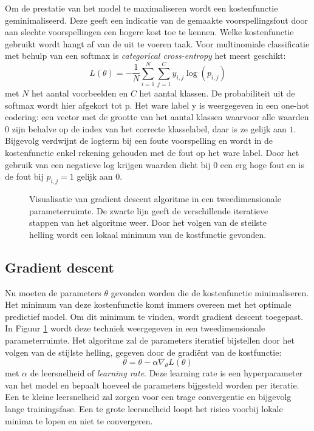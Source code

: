 \npar Om de prestatie van het model te maximaliseren wordt een kostenfunctie geminimaliseerd. Deze geeft een indicatie van de gemaakte voorspellingsfout door aan slechte voorspellingen een hogere kost toe te kennen. Welke kostenfunctie gebruikt wordt hangt af van de uit te voeren taak. Voor multinomiale classificatie met behulp van een softmax is \textit{categorical cross-entropy} het meest geschikt:
\begin{equation}
L(\theta) = - \frac{1}{N}\sum_{i=1}^{N}\sum_{j=1}^{C}y_{i,j}\log(p_{i,j})
\end{equation}
met $N$ het aantal voorbeelden en $C$ het aantal klassen. De probabiliteit uit de softmax wordt hier afgekort tot p. Het ware label y is weergegeven in een one-hot codering: een vector met de grootte van het aantal klassen waarvoor alle waarden $0$ zijn behalve op de index van het correcte klasselabel, daar is ze gelijk aan $1$. Bijgevolg verdwijnt de logterm bij een foute voorspelling en wordt in de kostenfunctie enkel rekening gehouden met de fout op het ware label. Door het gebruik van een negatieve log krijgen waarden dicht bij $0$ een erg hoge fout en is de fout bij $p_{i,j}=1$ gelijk aan $0$. 
\begin{figure}[!t]
	\centering
	\def\svgwidth{0.6\columnwidth}
	
	\caption{Visualisatie van gradient descent algoritme in een tweedimensionale parameterruimte. De zwarte lijn geeft de verschillende iteratieve stappen van het algoritme weer. Door het volgen van de steilste helling wordt een lokaal minimum van de kostfunctie gevonden.}
	\label{fig:gradient-descent}
\end{figure}
\subsection{Gradient descent}
\npar Nu moeten de parameters $\theta$ gevonden worden die de kostenfunctie minimaliseren. Het minimum van deze kostenfunctie komt immers overeen met het optimale predictief model. Om dit minimum te vinden, wordt gradient descent toegepast. In Figuur \ref{fig:gradient-descent} wordt deze techniek weergegeven in een tweedimensionale parameterruimte. Het algoritme zal de parameters iteratief bijstellen door het volgen van de stijlste helling, gegeven door de gradi\"ent van de kostfunctie:
\begin{equation}\label{eq:grad-desc}
\theta = \theta - \alpha \nabla_\theta L(\theta)
\end{equation}
met $\alpha$ de leersnelheid of \textit{learning rate}. Deze learning rate is een hyperparameter van het model en bepaalt hoeveel de parameters bijgesteld worden per iteratie. Een te kleine leersnelheid zal zorgen voor een trage convergentie en bijgevolg lange trainingsfase. Een te grote leersnelheid loopt het risico voorbij lokale minima te lopen en niet te convergeren.

